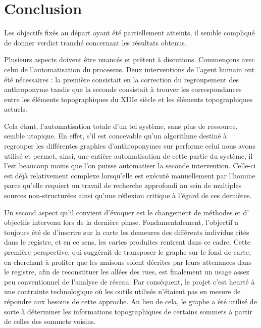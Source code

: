 \section{Conclusion}
Les objectifs fixés au départ ayant été partiellement atteints, il semble compliqué de donner verdict tranché concernant les résultats obtenus. 

Plusieurs aspects doivent être nuancés et prêtent à discutions.
Commençons avec celui de l'automatisation du processus.
Deux interventions de l'agent humain ont été nécessaires : la première consistait en la correction du regroupement des anthroponyme tandis que la seconde consistait à trouver les correspondances entre les éléments topographiques du XIIIe siècle et les éléments topographiques actuels. 

Cela étant, l'automatisation totale d'un tel système, sans plus de ressource, semble utopique. En effet, s'il est concevable qu'un algorithme destiné à regrouper les différentes graphies d'anthroponymes sur performe celui nous avons utilisé et permet, ainsi, une entière automatisation de cette partie du système, il l'est beaucoup moins que l'on puisse automatiser la seconde intervention. Celle-ci est déjà relativement complexe lorsqu'elle est exécuté manuellement par l'homme parce qu'elle requiert un travail de recherche approfondi au sein de multiples sources non-structurées ainsi qu'une réflexion critique à l'égard de ces dernières.

Un second aspect qu'il convient d'évoquer est le changement de méthodes et d' objectifs intervenu lors de la dernière phase. Fondamentalement, l'objectif a toujours été de d'inscrire sur la carte les demeures des différents individus cités dans le registre, et en ce sens, les cartes produites rentrent dans ce cadre. Cette première perspective, qui suggérait de transposer le graphe sur le fond de carte, en cherchant à profiter que les maisons  soient décrites par leurs attenances dans le registre, afin de reconstituer les allées des rues, est finalement un usage assez peu conventionnel de l'analyse de réseau. Par conséquent, le projet c'est heurté à une contrainte technologique où les outils utilisés n'étaient pas en mesure de répondre aux besoins de cette approche. Au lieu de cela, le graphe a été utilisé de sorte à déterminer les informations topographiques de certains sommets à partir de celles  des sommets voisins. 

